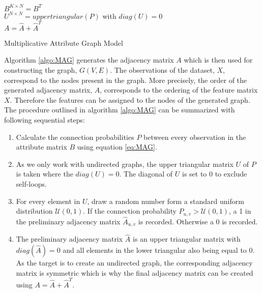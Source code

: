 	\begin{algorithm}[h]
		\scriptsize
		\SetAlgoLined
		\nl $B^{K \times N} = B^{T}$ \\
		\nl {}
		\nl $U^{N \times N} = uppertriangular(P)$ with $diag(U)=0$\\
		\nl {}
		\nl $A = \hat A + \hat A^{T}$

		\caption{Multiplicative Attribute Graph Model}
		\label{algo:MAG}
	\end{algorithm}

	\noindent Algorithm \ref{algo:MAG} generates the adjacency matrix $A$ which
	is then used for constructing the graph, $G(V,E)$. The observations of the
	dataset, $X$, correspond to the nodes present in the graph. More precisely,
	the order of the generated adjacency matrix, $A$, corresponds to the
	ordering of the feature matrix $X$. Therefore the features can be assigned
	to the nodes of the generated graph. The procedure outlined in algorithm
	\ref{algo:MAG} can be summarized with following sequential steps:

	\begin{enumerate}
		\item Calculate the connection probabilities $P$ between every 
			observation in the attribute matrix $B$ using equation \ref{eq:MAG}. 
		\item As we only work with undirected graphs, the upper triangular
			matrix $U$ of $P$ is taken where the $diag(U) = 0$. The diagonal of
			$U$ is set to 0 to exclude self-loops.
		\item For every element in $U$, draw a random number form a standard
			uniform distribution $\mathcal{U}(0,1)$. If the connection
			probability $P_{u,v}>\mathcal{U}(0,1)$, a 1 in the
			preliminary adjacency matrix $\hat A_{u,v}$ is recorded.
			Otherwise a 0 is recorded.
		\item The preliminary adjacency matrix $\hat A$ is an upper triangular
			matrix with $diag(\hat A) = 0$ and all elements in the lower
			triangular also being equal to 0. As the target is to create an
			undirected graph, the corresponding adjacency matrix is symmetric
			which is why the final adjacency matrix can be created using 
			$A = \hat A + \hat A^{T}$. 
	\end{enumerate}

